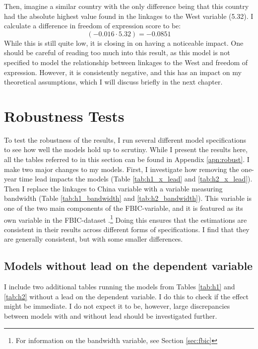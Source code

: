 Then, imagine a similar country with the only difference being that this country had the absolute highest value found in the linkages to the West variable (5.32). I calculate a difference in freedom of expression score to be:
\begin{equation*}
    (-0.016 \cdot 5.32) = -0.0851
\end{equation*}
While this is still quite low, it is closing in on having a noticeable impact. One should be careful of reading too much into this result, as this model is not specified to model the relationship between linkages to the West and freedom of expression. However, it is consistently negative, and this has an impact on my theoretical assumptions, which I will discuss briefly in the next chapter.

\section{Robustness Tests} \label{sec:robust}
To test the robustness of the results, I run several different model specifications to see how well the models hold up to scrutiny. While I present the results here, all the tables referred to in this section can be found in Appendix \ref{apn:robust}. I make two major changes to my models. First, I investigate how removing the one-year time lead impacts the models (Table \ref{tab:h1_x_lead} and \ref{tab:h2_x_lead}). Then I replace the linkages to China variable with a variable measuring bandwidth (Table \ref{tab:h1_bandwidth} and \ref{tab:h2_bandwidth}). This variable is one of the two main components of the FBIC-variable, and it is featured as its own variable in the FBIC-dataset \citep{moyer_china-us_2021}.\footnote{For information on the bandwidth variable, see Section \ref{sec:fbic}} Doing this ensures that the estimations are consistent in their results across different forms of specifications. I find that they are generally consistent, but with some smaller differences.

\subsection{Models without lead on the dependent variable}
I include two additional tables running the models from Tables \ref{tab:h1} and \ref{tab:h2} without a lead on the dependent variable. I do this to check if the effect might be immediate. I do not expect it to be, however, large discrepancies between models with and without lead should be investigated further.

